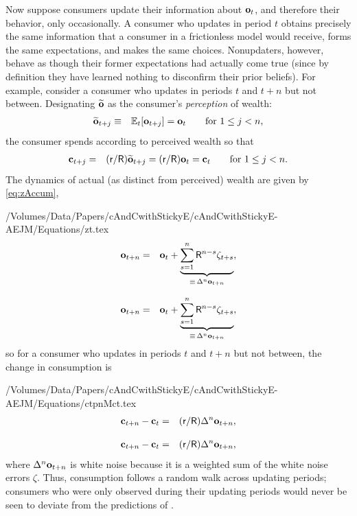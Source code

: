 \documentclass[titlepage]{./econtex}
\begin{document}
Now suppose consumers update their information about $\mathbf{o}_t$, and therefore their behavior, only occasionally.  A consumer who updates in period $t$ obtains precisely the same information that a consumer in a frictionless model would receive, forms the same expectations, and makes the same choices.  Nonupdaters, however, behave as though their former expectations had actually come true (since by definition they have learned nothing to disconfirm their prior beliefs).  For example, consider a consumer who updates in periods $t$ and $t+n$ but not between.  Designating $\widetilde{\mathbf{o}}$ as the consumer's {\it perception} of wealth:
  \begin{eqnarray*}
\widetilde{\mathbf{o}}_{t+j} & \equiv & \operatorname{\mathbb{E}}_{t}[\mathbf{o}_{t+j}] = \mathbf{o}_{t} \qquad \text{for }  1\le j < n,
\end{eqnarray*}
  the consumer spends according to perceived wealth so that
  \begin{eqnarray*}
\mathbf{c}_{t+j} & = & (\mathsf{r}/\mathsf{R})\widetilde{\mathbf{o}}_{t+j} = (\mathsf{r}/\mathsf{R})     \mathbf{o} _{t} = \mathbf{c}_{t} \qquad \text{for }  1\le j < n.
\end{eqnarray*}
The dynamics of actual (as distinct from perceived) wealth are given by \eqref{eq:zAccum},
\begin{verbatimwrite}{/Volumes/Data/Papers/cAndCwithStickyE/cAndCwithStickyE-AEJM/Equations/zt.tex}
\begin{eqnarray*}
 \mathbf{o}_{t+n} & = & \mathbf{o}_{t}+\underbrace{\sum_{s=1}^{n} \mathsf{R}^{n-s}\zeta_{t+s}}_{\equiv\,\Delta^{n} \mathbf{o}_{t+n}},
\end{eqnarray*}
\end{verbatimwrite}
\begin{eqnarray*}
 \mathbf{o}_{t+n} & = & \mathbf{o}_{t}+\underbrace{\sum_{s=1}^{n} \mathsf{R}^{n-s}\zeta_{t+s}}_{\equiv\,\Delta^{n} \mathbf{o}_{t+n}},
\end{eqnarray*}
 so for a consumer who updates in periods $t$ and $t+n$ but not between, the change in consumption is
\begin{verbatimwrite}{/Volumes/Data/Papers/cAndCwithStickyE/cAndCwithStickyE-AEJM/Equations/ctpnMct.tex}
\begin{eqnarray*}
         \mathbf{c}_{t+n}-\mathbf{c}_{t}  & = & (\mathsf{r}/\mathsf{R})\Delta^{n}\mathbf{o}_{t+n},
\end{eqnarray*}
\end{verbatimwrite}
\begin{eqnarray*}
         \mathbf{c}_{t+n}-\mathbf{c}_{t}  & = & (\mathsf{r}/\mathsf{R})\Delta^{n}\mathbf{o}_{t+n},
\end{eqnarray*}
  where $\Delta^{n}\mathbf{o}_{t+n}$ is white noise because it is a weighted sum of the white noise errors $\zeta$.  Thus, consumption follows a random walk across updating periods; consumers who were only observed during their updating periods would never be seen to deviate from the predictions of \cite{hallRandomWalk}.
\end{document}
